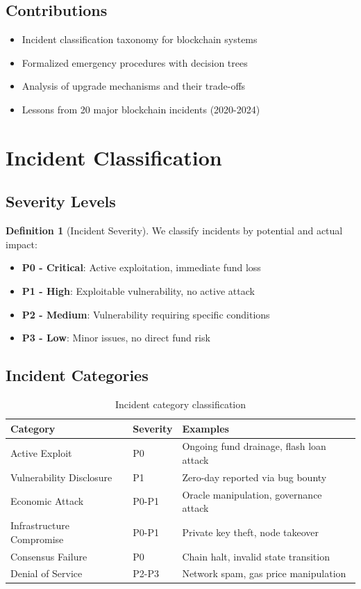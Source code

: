 \documentclass[11pt,a4paper]{article}
\theoremstyle{definition}
\newtheorem{definition}{Definition}
\begin{document}
\subsection{Contributions}

\begin{itemize}
    \item Incident classification taxonomy for blockchain systems
    \item Formalized emergency procedures with decision trees
    \item Analysis of upgrade mechanisms and their trade-offs
    \item Lessons from 20 major blockchain incidents (2020-2024)
\end{itemize}

\section{Incident Classification}

\subsection{Severity Levels}

\begin{definition}[Incident Severity]
We classify incidents by potential and actual impact:
\begin{itemize}
    \item \textbf{P0 - Critical}: Active exploitation, immediate fund loss
    \item \textbf{P1 - High}: Exploitable vulnerability, no active attack
    \item \textbf{P2 - Medium}: Vulnerability requiring specific conditions
    \item \textbf{P3 - Low}: Minor issues, no direct fund risk
\end{itemize}
\end{definition}

\subsection{Incident Categories}

\begin{table}[h]
\centering
\begin{tabular}{llp{6cm}}
\toprule
\textbf{Category} & \textbf{Severity} & \textbf{Examples} \\
\midrule
Active Exploit & P0 & Ongoing fund drainage, flash loan attack \\
Vulnerability Disclosure & P1 & Zero-day reported via bug bounty \\
Economic Attack & P0-P1 & Oracle manipulation, governance attack \\
Infrastructure Compromise & P0-P1 & Private key theft, node takeover \\
Consensus Failure & P0 & Chain halt, invalid state transition \\
Denial of Service & P2-P3 & Network spam, gas price manipulation \\
\bottomrule
\end{tabular}
\caption{Incident category classification}
\end{table}
\end{document}
